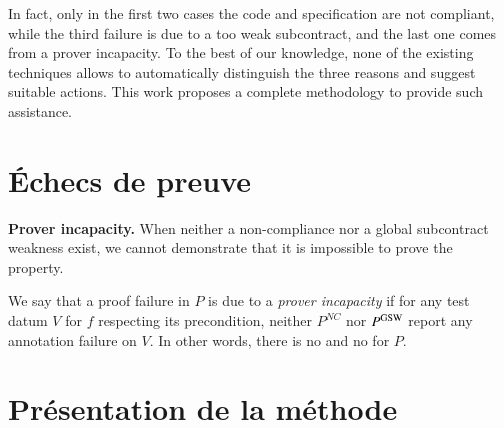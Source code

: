 In fact, only in the first two cases the code and specification are not compliant, while
the third failure is due to a too weak subcontract, and the last one comes from a prover incapacity.
To the best of our knowledge, 
none of the existing  techniques allows to automatically
distinguish the three reasons and suggest suitable actions.
This work proposes a complete methodology to provide such assistance.


\section{Échecs de preuve}
\label{sec:method-proof-failures}




\textbf{Prover incapacity.}
When neither a non-compliance nor a global subcontract weakness
exist, we cannot demonstrate that it is impossible to prove the property.

\begin{definition} 
\label{def:prov-incap}
We say that a proof failure in $P$ is due to a \emph{prover incapacity} 
if for any test datum $V$ for $f$ respecting its precondition,
neither $P^{NC}$ nor $P^{\mathrm{GSW}}$ report any annotation failure on $V$.
In other words, there is no \NCCE and no \GSWCE for $P$.
\end{definition}


\section{Présentation de la méthode}
\label{sec:method-presentation}


